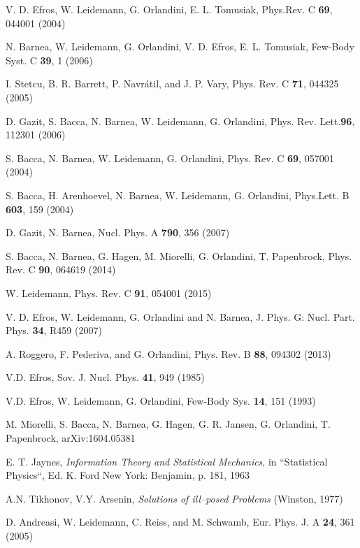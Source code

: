 \begin{thebibliography}{00}
 V. D. Efros, W. Leidemann, G. Orlandini, E. L. Tomusiak,  Phys.Rev. C {\bf  69},  044001 (2004)

 N. Barnea, W. Leidemann, G. Orlandini, V. D. Efros, E. L. Tomusiak, Few-Body Syst. C {\bf 39}, 1 (2006)

 I. Stetcu, B. R. Barrett, P. Navr\'atil, and J. P. Vary, Phys. Rev. C \textbf{71}, 044325 (2005)

 D. Gazit, S. Bacca, N. Barnea, W. Leidemann, G. Orlandini, Phys. Rev. Lett.{\bf  96}, 112301 (2006)

 S. Bacca, N. Barnea, W. Leidemann, G. Orlandini, Phys. Rev. C {\bf 69}, 057001 (2004)

 S. Bacca, H. Arenhoevel, N. Barnea, W. Leidemann, G. Orlandini,  Phys.Lett. B {\bf 603}, 159 (2004)

D. Gazit, N. Barnea, Nucl. Phys. A {\bf 790}, 356 (2007)

 S. Bacca, N. Barnea, G. Hagen, M. Miorelli, G. Orlandini, T. Papenbrock, Phys. Rev. C {\bf 90}, 064619 (2014)

 W. Leidemann, Phys. Rev. C {\bf 91}, 054001 (2015)

 V. D. Efros, W. Leidemann, G. Orlandini and N. Barnea,
J. Phys. G: Nucl. Part. Phys. {\bf 34}, R459 (2007)

 A. Roggero, F. Pederiva, and G. Orlandini, Phys. Rev. B {\bf 88}, 094302 (2013)

 V.D. Efros, Sov. J. Nucl. Phys. {\bf 41}, 949 (1985)

 V.D. Efros,  W. Leidemann, G. Orlandini, Few-Body Sys. {\bf 14}, 151 (1993)

 M. Miorelli, S. Bacca, N. Barnea, G. Hagen, G. R. Jansen, G. Orlandini, T. Papenbrock, arXiv:1604.05381
 
  E. T. Jaynes, {\it Information Theory and Statistical Mechanics}, in “Statistical Physics“, Ed. K.
Ford New York: Benjamin, p. 181, 1963

 A.N. Tikhonov, V.Y. Arsenin, {\it Solutions of ill--posed Problems} (Winston, 1977)

D. Andreasi, W. Leidemann, C. Reiss, and M. Schwamb, Eur. Phys. J. A {\bf 24}, 361 (2005)

\end{thebibliography}



